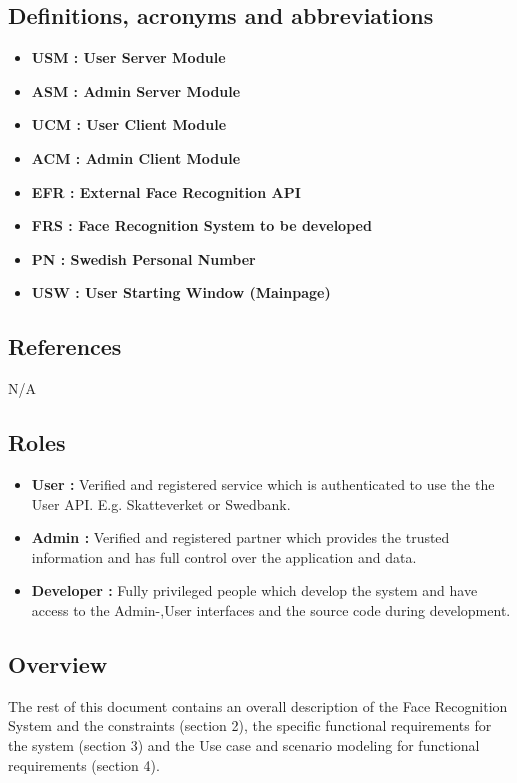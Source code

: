 \documentclass[a4paper,11pt]{article}
\begin{document}
 
\subsection{Definitions, acronyms and abbreviations}
\begin{itemize}
\item \textbf{USM : User Server Module}
\item \textbf{ASM : Admin Server Module}
\item \textbf{UCM : User Client Module}
\item \textbf{ACM : Admin Client Module}
\item \textbf{EFR : External Face Recognition API}
\item \textbf{FRS : Face Recognition System to be developed}
\item \textbf{PN : Swedish Personal Number}
\item \textbf{USW : User Starting Window (Mainpage)}
\end{itemize}

\subsection{References}
N/A
\subsection{Roles} \label{Roles}
\begin{itemize}
\item \textbf{User :} Verified and registered service which is authenticated to use the the User API. E.g. Skatteverket or Swedbank.
\item \textbf{Admin :} Verified and registered partner which provides the trusted information and has full control over the application and data.
\item \textbf{Developer :} Fully privileged people which develop the system and have access to the Admin-,User interfaces and the source code during development. 
\end{itemize}

\subsection{Overview}
The rest of this document contains an overall description of the Face Recognition System and the constraints (section 2), the specific functional requirements for the system (section 3) and the Use case and scenario modeling for functional requirements (section 4).
\end{document}

